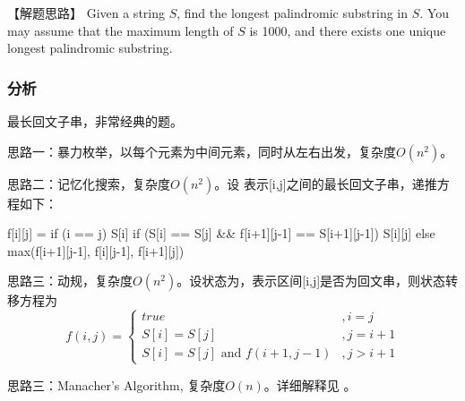 【解题思路】
Given a string $S$, find the longest palindromic substring in $S$. You may assume that the maximum length of $S$ is 1000, and there exists one unique longest palindromic substring.


\subsubsection{分析}
最长回文子串，非常经典的题。

思路一：暴力枚举，以每个元素为中间元素，同时从左右出发，复杂度$O(n^2)$。

思路二：记忆化搜索，复杂度$O(n^2)$。设 表示[i,j]之间的最长回文子串，递推方程如下：
\begin{Code}
	f[i][j] = if (i == j) S[i]
	if (S[i] == S[j] && f[i+1][j-1] == S[i+1][j-1]) S[i][j]
	else max(f[i+1][j-1], f[i][j-1], f[i+1][j])
\end{Code}

思路三：动规，复杂度$O(n^2)$。设状态为，表示区间[i,j]是否为回文串，则状态转移方程为
$$
f(i,j)=\begin{cases}
true & ,i=j\\
S[i]=S[j] & , j = i + 1 \\
S[i]=S[j] \text{ and } f(i+1, j-1) & , j > i + 1
\end{cases}
$$

思路三：Manacher’s Algorithm, 复杂度$O(n)$。详细解释见  。


